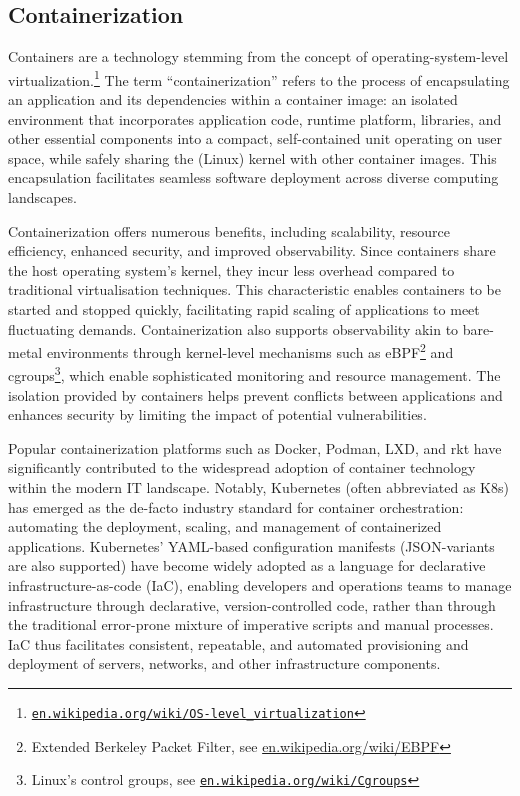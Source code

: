 \documentclass{easychair}
\begin{document}
\subsection{Containerization}
\label{Containerization}

Containers are a technology stemming from the concept of operating-system-level 
virtualization.\footnote{%
\href{https://en.wikipedia.org/wiki/OS-level_virtualization}{\tt en.wikipedia.org/wiki/OS-level\_virtualization}} 
The term ``containerization'' refers to the process of encapsulating an application and its 
dependencies within a container image: an isolated environment that incorporates application code, 
runtime platform, libraries, and other essential components into a compact, self-contained unit 
operating on user space, while safely sharing the (Linux) kernel with other container images. 
This encapsulation facilitates seamless software deployment across diverse computing landscapes.

Containerization offers numerous benefits, including scalability, resource efficiency, enhanced 
security, and improved observability. 
Since containers share the host operating system's kernel, they incur less overhead compared to 
traditional virtualisation techniques. 
This characteristic enables containers to be started and stopped quickly, facilitating rapid 
scaling of applications to meet fluctuating demands. 
Containerization also supports observability akin to bare-metal environments through kernel-level 
mechanisms such as eBPF\footnote{%
Extended Berkeley Packet Filter, see \href{https://en.wikipedia.org/wiki/EBPF}{en.wikipedia.org/wiki/EBPF}}
and cgroups\footnote{%
Linux's control groups, see \href{https://en.wikipedia.org/wiki/Cgroups}{\tt en.wikipedia.org/wiki/Cgroups}}, 
which enable sophisticated monitoring and resource management. 
The isolation provided by containers helps prevent conflicts between applications and enhances 
security by limiting the impact of potential vulnerabilities.

Popular containerization platforms such as Docker, Podman, LXD, and rkt have significantly 
contributed to the widespread adoption of container technology within the modern IT landscape. 
Notably, Kubernetes (often abbreviated as K8s) has emerged as the de-facto industry standard for 
container orchestration: automating the deployment, scaling, and management of containerized 
applications. 
Kubernetes' YAML-based configuration manifests (JSON-variants are also supported) have become 
widely adopted as a language for  declarative infrastructure-as-code (IaC), enabling developers 
and operations teams to manage infrastructure through declarative, version-controlled code, 
rather than through the traditional error-prone mixture of imperative scripts and manual processes. 
IaC thus facilitates consistent, repeatable, and automated provisioning and deployment of servers, 
networks, and other infrastructure components.
\end{document}
